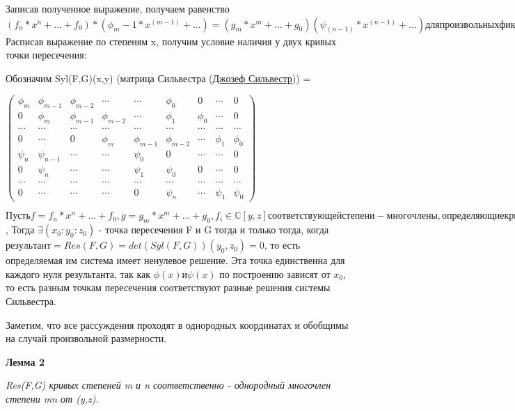 \documentclass[a4paper, 12pt]{article}
\begin{document}
Записав полученное выражение, получаем равенство $(f_n*x^n + ... + f_0)*(\phi_m-1*x^(m-1) + ...) = (g_m*x^m + ... + g_0)(\psi_(n-1)*x^(n-1) + ...) для произвольных фиксированных y_0, z_0$
Расписав выражение по степеням x, получим условие наличия у двух кривых точки пересечения:

Обозначим Syl(F,G)(x,y) (матрица Сильвестра (\href{https://ru.wikipedia.org/wiki/%D0%A1%D0%B8%D0%BB%D1%8C%D0%B2%D0%B5%D1%81%D1%82%D1%80,_%D0%94%D0%B6%D0%B5%D0%B9%D0%BC%D1%81_%D0%94%D0%B6%D0%BE%D0%B7%D0%B5%D1%84}{Джозеф Сильвестр})) =

$\begin{pmatrix}
\phi_m & \phi_{m-1} & \phi_{m-2} & \cdots & \cdots & \phi_0 & 0 & \cdots & 0 \\
0 & \phi_m & \phi_{m-1} & \phi_{m-2} & \cdots & \phi_1 & \phi_0 & \cdots & 0 \\
\cdots & \cdots & \cdots & \cdots & \cdots & \cdots & \cdots & \cdots & \cdots \\
0 & \cdots & 0 & \phi_m & \phi_{m-1} & \phi_{m-2} & \cdots & \phi_1 & \phi_0 \\
\psi_n & \psi_{n-1} & \cdots & \cdots & \psi_0 & 0 & \cdots & \cdots & 0 \\
0 & \psi_n & \cdots & \cdots & \psi_1 & \psi_0 & 0 & \cdots & 0 \\
\cdots & \cdots & \cdots & \cdots & \cdots & \cdots & \cdots & \cdots & \cdots \\
0 & \cdots & \cdots & \cdots & 0 & \psi_n & \cdots & \psi_1 & \psi_0
\end{pmatrix}$

$Пусть f=f_n*x^n + ... + f_0, g=g_m*x^m + ... + g_0, f_i \in \mathbb{C}[y,z] соответствующей степени - многочлены, определяющие кривые F и G$,
Тогда $\exists (x_0:y_0:z_0)$ - точка пересечения F и G тогда и только тогда, когда $результант = Res(F,G) = det(Syl(F,G))(y_0,z_0) = 0$, то есть определяемая им система имеет ненулевое решение. Эта точка единственна для каждого нуля результанта, так как $\phi(x) и \psi(x)$ по построению зависят от $x_0$, то есть разным точкам пересечения соответствуют разные решения системы Сильвестра.

Заметим, что все рассуждения проходят в однородных координатах и обобщимы на случай произвольной размерности.

\textbf{Лемма 2}

\textit{Res(F,G) кривых степеней m и n соответственно - однородный многочлен степени mn от (y,z).}

\end{document}
